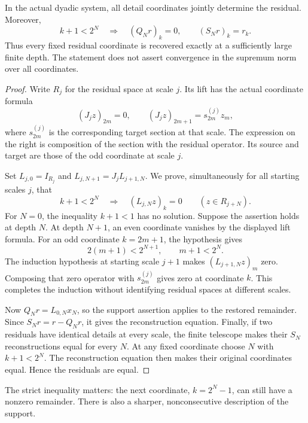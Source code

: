 \begin{KStheorem}\label{KS:KS28}
In the actual dyadic system, all detail coordinates jointly determine the residual. Moreover,
\[
 k+1<2^N\quad\Longrightarrow\quad
 (Q_Nr)_k=0,\qquad(S_Nr)_k=r_k.
\]
Thus every fixed residual coordinate is recovered exactly at a sufficiently large finite depth. The statement does not assert convergence in the supremum norm over all coordinates.
\end{KStheorem}
\begin{proof}
Write \(R_j\) for the residual space at scale \(j\). Its lift has the actual coordinate formula
\[
 (J_jz)_{2m}=0,\qquad (J_jz)_{2m+1}=s^{(j)}_{2m}z_m,
\]
where \(s^{(j)}_{2m}\) is the corresponding target section at that scale. The expression on the right is composition of the section with the residual operator. Its source and target are those of the odd coordinate at scale \(j\).

Set \(L_{j,0}=I_{R_j}\) and \(L_{j,N+1}=J_jL_{j+1,N}\). We prove, simultaneously for all starting scales \(j\), that
\[
 k+1<2^N\quad\Longrightarrow\quad (L_{j,N}z)_k=0
 \qquad(z\in R_{j+N}).
\]
For \(N=0\), the inequality \(k+1<1\) has no solution. Suppose the assertion holds at depth \(N\). At depth \(N+1\), an even coordinate vanishes by the displayed lift formula. For an odd coordinate \(k=2m+1\), the hypothesis gives
\[
 2(m+1)<2^{N+1},\qquad m+1<2^N.
\]
The induction hypothesis at starting scale \(j+1\) makes \((L_{j+1,N}z)_m\) zero. Composing that zero operator with \(s^{(j)}_{2m}\) gives zero at coordinate \(k\). This completes the induction without identifying residual spaces at different scales.

Now \(Q_Nr=L_{0,N}x_N\), so the support assertion applies to the restored remainder. Since \(S_Nr=r-Q_Nr\), it gives the reconstruction equation. Finally, if two residuals have identical details at every scale, the finite telescope makes their \(S_N\) reconstructions equal for every \(N\). At any fixed coordinate choose \(N\) with \(k+1<2^N\). The reconstruction equation then makes their original coordinates equal. Hence the residuals are equal.
\end{proof}
The strict inequality matters: the next coordinate, \(k=2^N-1\), can still have a nonzero remainder. There is also a sharper, nonconsecutive description of the support.

